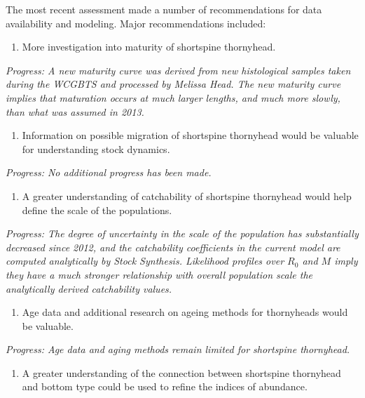 \documentclass[11pt,
  english,
  letterpaper,
]{article}
\providecommand{\tightlist}{%
  \setlength{\itemsep}{0pt}\setlength{\parskip}{0pt}}
\providecommand{\tightlist}{%
  \setlength{\itemsep}{0pt}\setlength{\parskip}{0pt}}
\begin{document}
The most recent assessment made a number of recommendations for data availability and modeling. Major recommendations included:

\begin{enumerate}
\def\labelenumi{\arabic{enumi}.}
\tightlist
\item
  More investigation into maturity of shortspine thornyhead.
\end{enumerate}

\emph{Progress: A new maturity curve was derived from new histological samples taken during the WCGBTS and processed by Melissa Head. The new maturity curve implies that maturation occurs at much larger lengths, and much more slowly, than what was assumed in 2013.}

\begin{enumerate}
\def\labelenumi{\arabic{enumi}.}
\setcounter{enumi}{1}
\tightlist
\item
  Information on possible migration of shortspine thornyhead would be valuable for understanding stock dynamics.
\end{enumerate}

\emph{Progress: No additional progress has been made.}

\begin{enumerate}
\def\labelenumi{\arabic{enumi}.}
\setcounter{enumi}{2}
\tightlist
\item
  A greater understanding of catchability of shortspine thornyhead would help define the scale of the populations.
\end{enumerate}

\emph{Progress: The degree of uncertainty in the scale of the population has substantially decreased since 2012, and the catchability coefficients in the current model are computed analytically by Stock Synthesis. Likelihood profiles over \(R_0\) and \(M\) imply they have a much stronger relationship with overall population scale the analytically derived catchability values.}

\begin{enumerate}
\def\labelenumi{\arabic{enumi}.}
\setcounter{enumi}{3}
\tightlist
\item
  Age data and additional research on ageing methods for thornyheads would be valuable.
\end{enumerate}

\emph{Progress: Age data and aging methods remain limited for shortspine thornyhead.}

\begin{enumerate}
\def\labelenumi{\arabic{enumi}.}
\setcounter{enumi}{4}
\tightlist
\item
  A greater understanding of the connection between shortspine thornyhead and bottom type could be used to refine the indices of abundance.
\end{enumerate}
\end{document}
